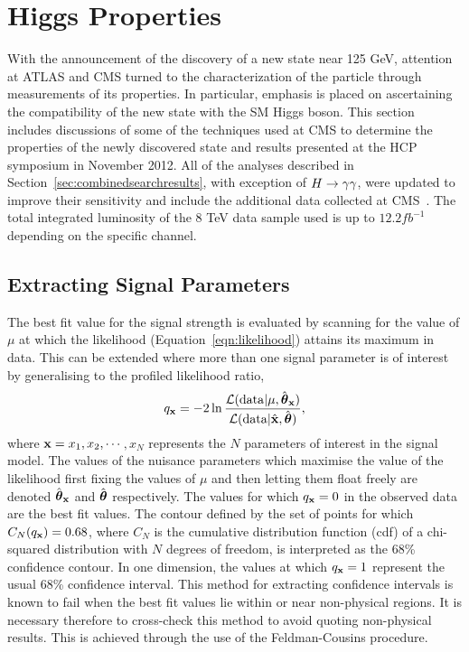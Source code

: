 \section{Higgs Properties}
\label{sec:properties}

With the announcement of the discovery of a new state near 125 GeV, attention at ATLAS and CMS 
turned to the characterization of the particle through  measurements of its properties. 
In particular, emphasis is placed on ascertaining the compatibility 
of the new state with the SM Higgs boson.
This section includes discussions of some of the techniques used at CMS to determine the properties 
of the newly discovered state and results presented at the HCP symposium in November 2012. 
All of the analyses described in Section~\ref{sec:combinedsearchresults},
with exception of $H\rightarrow\gamma\gamma$, were updated to improve their sensitivity 
and include the additional data collected at CMS~\citep{HIG-12-045}. The total integrated 
luminosity of the 8 TeV data sample used is up to $12.2 fb^{-1}$ depending on the
specific channel.

\subsection{Extracting Signal Parameters}

The best fit value for the signal strength is evaluated 
by scanning for the value of $\mu$ at which the likelihood (Equation~\ref{eqn:likelihood})
attains its maximum in data. This can be extended where more than one signal parameter
is of interest by generalising to the profiled likelihood ratio,
\begin{equation}
q_{{\mathbf{x}}} = 
	-2\ln\frac{\displaystyle \mathcal{L}(\mathrm{data} | \mu,\hat{{\boldsymbol{\theta}}}_{{\mathbf{x}}})}
	{\displaystyle \mathcal{L}(\mathrm{data} | \hat{{\mathbf{x}}},\hat{{\boldsymbol{\theta}}})}, 
\label{eqn:llrNd}
\end{equation}
where ${\mathbf{x}}=x_{1},x_{2},\cdots$$,x_{N}$ represents the $N$ parameters
of interest in the signal model. The values of the nuisance parameters 
which maximise the value of the likelihood first 
fixing the values of $\mu$ and then letting them float freely are
denoted $\hat{{\boldsymbol{\theta}}}_{{\mathbf{x}}}$ and $\hat{{\boldsymbol{\theta}}}$ respectively.
The values for which $q_{{\mathbf{x}}}=0$ in the observed data are the best fit values.
The contour defined by the set of points for which $C_{N}(q_{{\mathbf{x}}})=0.68$,
where $C_{N}$ is the cumulative distribution function (cdf) of a chi-squared distribution
with $N$ degrees of freedom, is interpreted
as the 68\% confidence contour. In one dimension, the values at which $q_{{\mathbf{x}}}=1$
represent the usual 68\% confidence interval.
This method for extracting confidence intervals is known to fail when the best fit 
values lie within or near non-physical regions.
It is necessary therefore to cross-check this method to avoid quoting
non-physical results. This is achieved through the use of the Feldman-Cousins procedure.

